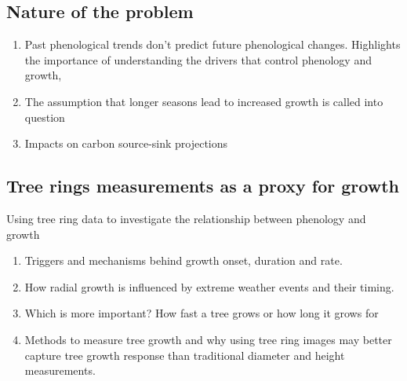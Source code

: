 \documentclass{article}
\begin{document}
\subsection{Nature of the problem} 
\begin{enumerate}
	\item Past phenological trends don't predict future phenological changes. Highlights the importance of understanding the drivers that control phenology and growth,
	\item The assumption that longer seasons lead to increased growth is called into question
	\item Impacts on carbon source-sink projections
\end{enumerate}

\subsection{Tree rings measurements as a proxy for growth}
Using tree ring data to investigate the relationship between phenology and growth

\begin{enumerate}
	\item Triggers and mechanisms behind growth onset, duration and rate.
	\item How radial growth is influenced by extreme weather events and their timing. 
	\item Which is more important? How fast a tree grows or how long it grows for
	\item Methods to measure tree growth and why using tree ring images may better capture tree growth response than traditional diameter and height measurements.
\end{enumerate}
\end{document}
